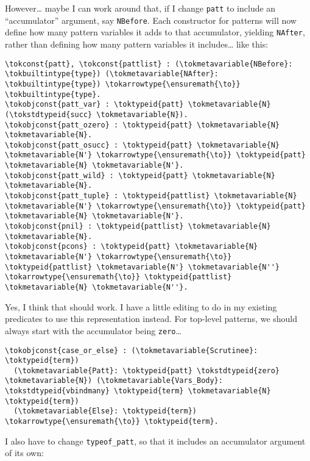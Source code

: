 However\ldots{} maybe I can work around that, if I change \texttt{patt}
to include an ``accumulator'' argument, say \texttt{NBefore}. Each
constructor for patterns will now define how many pattern variables it
adds to that accumulator, yielding \texttt{NAfter}, rather than defining
how many pattern variables it includes\ldots{} like this:

\begin{verbatim}
\tokconst{patt}, \tokconst{pattlist} : (\tokmetavariable{NBefore}: \tokbuiltintype{type}) (\tokmetavariable{NAfter}: \tokbuiltintype{type}) \tokarrowtype{\ensuremath{\to}} \tokbuiltintype{type}.
\tokobjconst{patt_var} : \toktypeid{patt} \tokmetavariable{N} (\tokstdtypeid{succ} \tokmetavariable{N}).
\tokobjconst{patt_ozero} : \toktypeid{patt} \tokmetavariable{N} \tokmetavariable{N}.
\tokobjconst{patt_osucc} : \toktypeid{patt} \tokmetavariable{N} \tokmetavariable{N'} \tokarrowtype{\ensuremath{\to}} \toktypeid{patt} \tokmetavariable{N} \tokmetavariable{N'}.
\tokobjconst{patt_wild} : \toktypeid{patt} \tokmetavariable{N} \tokmetavariable{N}.
\tokobjconst{patt_tuple} : \toktypeid{pattlist} \tokmetavariable{N} \tokmetavariable{N'} \tokarrowtype{\ensuremath{\to}} \toktypeid{patt} \tokmetavariable{N} \tokmetavariable{N'}.
\tokobjconst{pnil} : \toktypeid{pattlist} \tokmetavariable{N} \tokmetavariable{N}.
\tokobjconst{pcons} : \toktypeid{patt} \tokmetavariable{N} \tokmetavariable{N'} \tokarrowtype{\ensuremath{\to}} \toktypeid{pattlist} \tokmetavariable{N'} \tokmetavariable{N''} \tokarrowtype{\ensuremath{\to}} \toktypeid{pattlist} \tokmetavariable{N} \tokmetavariable{N''}.
\end{verbatim}

Yes, I think that should work. I have a little editing to do in my
existing predicates to use this representation instead. For top-level
patterns, we should always start with the accumulator being
\texttt{zero}\ldots{}

\begin{verbatim}
\tokobjconst{case_or_else} : (\tokmetavariable{Scrutinee}: \toktypeid{term})
  (\tokmetavariable{Patt}: \toktypeid{patt} \tokstdtypeid{zero} \tokmetavariable{N}) (\tokmetavariable{Vars_Body}: \tokstdtypeid{vbindmany} \toktypeid{term} \tokmetavariable{N} \toktypeid{term})
  (\tokmetavariable{Else}: \toktypeid{term}) \tokarrowtype{\ensuremath{\to}} \toktypeid{term}.
\end{verbatim}

I also have to change \texttt{typeof\_patt}, so that it includes an
accumulator argument of its own:

